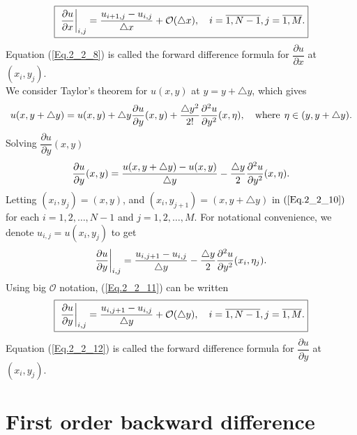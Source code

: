 \begin{align}{\label{Eq.2_2_8}}
\fbox{ $ \displaystyle \dfrac{\partial u}{\partial x}\bigg|_{i,j}= \dfrac{u_{i+1,j} - u_{i,j}}{\triangle x} + \mathcal{O}(\triangle x),\quad i =\overline{1,N-1}, j=\overline{1,M}.$}
\end{align}
Equation (\ref{Eq.2_2_8}) is called the forward difference formula for $ \dfrac{\partial u}{\partial x }$ at $(x_{i}, y_{j})$.
\\
We consider Taylor's theorem for $u(x,y)$ at $y = y + \triangle y$, which gives
\begin{align*}%
u(x, y + \triangle y) = u(x,y) + \triangle y \dfrac{\partial u}{\partial y}(x, y) + \dfrac{\triangle y^{2}}{2!} \dfrac{\partial^2 u}{\partial y^{2}} (x, \eta),\quad \text{where} \hspace{0.15cm} \eta \in (y, y + \triangle y).
\end{align*}
Solving $\dfrac{\partial u}{\partial y}(x, y)$
\begin{align}{\label{Eq.2_2_10}}
\dfrac{\partial u}{\partial y}(x, y) = \dfrac{u(x ,y + \triangle y ) - u(x,y )  }{\triangle y} -  \dfrac{\triangle y}{2} \dfrac{\partial^2 u}{\partial y^{2}} (x, \eta). 
\end{align}
Letting $(x_{i},y_{j})=(x,y)$, and $(x_{i},y_{j+1})=(x ,y+\triangle y )$ in $(\ref{Eq.2_2_10})$ for each $i = 1,2,\dots,N-1$ and $j = 1,2,\dots,M$. For notational convenience, we denote $u_{i,j}=u(x_{i},y_{j}) $ to get 
\begin{align}{\label{Eq.2_2_11}}
\dfrac{\partial u}{\partial y}\bigg|_{i,j} = \dfrac{u_{i,j+1} - u_{i,j}}{\triangle y} -  \dfrac{\triangle y}{2} \dfrac{\partial^2 u}{\partial y^{2}} (x_{i}, \eta_{j}).
\end{align}
Using big $\mathcal{O}$ notation, (\ref{Eq.2_2_11}) can be written
\begin{align}{\label{Eq.2_2_12}}
\fbox{ $ \displaystyle \dfrac{\partial u}{\partial y}\bigg|_{i,j} = \dfrac{u_{i,j+1} - u_{i,j}}{\triangle y} + \mathcal{O}(\triangle y), \quad i =\overline{1,N-1}, j=\overline{1,M}.$}
\end{align}
Equation (\ref{Eq.2_2_12}) is called the forward difference formula for $ \dfrac{\partial u}{\partial y }$ at $(x_{i}, y_{j})$.
\section{First order backward difference}
